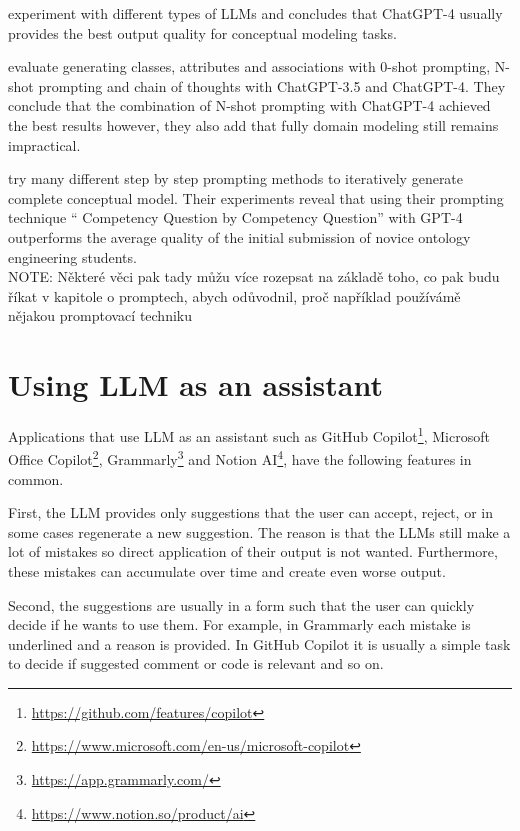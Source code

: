 \citet{BabaeiGiglou2023} experiment with different types of LLMs and concludes that ChatGPT-4 usually provides the best output quality for conceptual modeling tasks.

\citet{Chen2023} evaluate generating classes, attributes and associations with 0-shot prompting, N-shot prompting and chain of thoughts with ChatGPT-3.5 and ChatGPT-4. They conclude that the combination of N-shot prompting with ChatGPT-4 achieved the best results however, they also add that fully domain modeling still remains impractical.

\citet{Saeedizade2024} try many different step by step prompting methods to iteratively generate complete conceptual model. Their experiments reveal that using their prompting technique `` Competency Question by Competency Question'' with GPT-4 outperforms the average quality of the initial submission of novice ontology engineering students. \\


NOTE: Některé věci pak tady můžu více rozepsat na základě toho, co pak budu říkat v kapitole o promptech, abych odůvodnil, proč například používámě nějakou promptovací techniku \\


\section{Using LLM as an assistant}
\label{section:llm_as_an_assistant}

Applications that use LLM as an assistant such as GitHub Copilot\footnote{\url{https://github.com/features/copilot}}, Microsoft Office Copilot\footnote{\url{https://www.microsoft.com/en-us/microsoft-copilot}}, Grammarly\footnote{\url{https://app.grammarly.com/}} and Notion AI\footnote{\url{https://www.notion.so/product/ai}}, have the following features in common.

First, the LLM provides only suggestions that the user can accept, reject, or in some cases regenerate a new suggestion. The reason is that the LLMs still make a lot of mistakes so direct application of their output is not wanted. Furthermore, these mistakes can accumulate over time and create even worse output.

Second, the suggestions are usually in a form such that the user can quickly decide if he wants to use them. For example, in Grammarly each mistake is underlined and a reason is provided. In GitHub Copilot it is usually a simple task to decide if suggested comment or code is relevant and so on.


